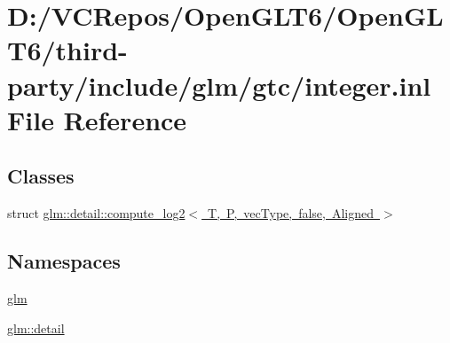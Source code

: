 \hypertarget{gtc_2integer_8inl}{}\section{D\+:/\+V\+C\+Repos/\+Open\+G\+L\+T6/\+Open\+G\+L\+T6/third-\/party/include/glm/gtc/integer.inl File Reference}
\label{gtc_2integer_8inl}
\subsection*{Classes}
\begin{DoxyCompactItemize}
\item 
struct \mbox{\hyperlink{structglm_1_1detail_1_1compute__log2_3_01_t_00_01_p_00_01vec_type_00_01false_00_01_aligned_01_4}{glm\+::detail\+::compute\+\_\+log2$<$ T, P, vec\+Type, false, Aligned $>$}}
\end{DoxyCompactItemize}
\subsection*{Namespaces}
\begin{DoxyCompactItemize}
\item 
 \mbox{\hyperlink{namespaceglm}{glm}}
\item 
 \mbox{\hyperlink{namespaceglm_1_1detail}{glm\+::detail}}
\end{DoxyCompactItemize}
